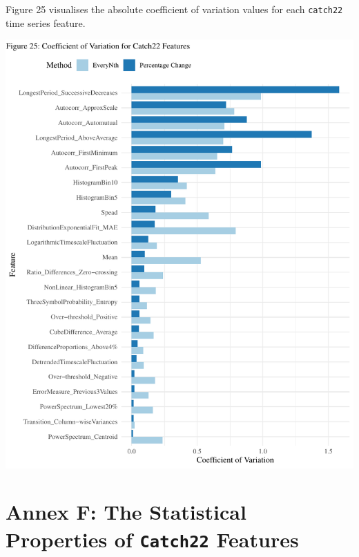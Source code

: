 \documentclass{article}
\begin{document}
\vspace{-0.3cm}

Figure 25 visualises the absolute coefficient of variation values for
each \texttt{catch22} time series feature.

\includegraphics{210431461_CSC8639_Dissertation_files/figure-latex/unnamed-chunk-21-1.pdf}

\hypertarget{annex-f-the-statistical-properties-of-catch22-features}{%
\section{\texorpdfstring{Annex F: The Statistical Properties of
\texttt{Catch22}
Features}{Annex F: The Statistical Properties of Catch22 Features}}\label{annex-f-the-statistical-properties-of-catch22-features}}
\end{document}
